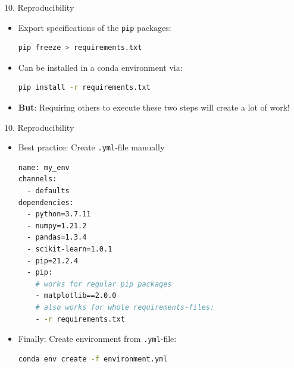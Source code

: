 
\begin{vbframe}{10. Reproducibility}

\vfill

\begin{itemize}
	\item Export specifications of the \texttt{pip} packages:
		\begin{lstlisting}[language=bash]
pip freeze > requirements.txt
		\end{lstlisting}
	\item Can be installed in a conda environment via:
		\begin{lstlisting}[language=bash]
pip install -r requirements.txt
		\end{lstlisting}
	\item \textbf{But}: Requiring others to execute these two steps will create a lot of work!
\end{itemize}

\vfill

\end{vbframe}


\begin{vbframe}{10. Reproducibility}

\vfill

\begin{itemize}
	\item Best practice: Create \texttt{.yml}-file manually
		\begin{lstlisting}[language=bash]
name: my_env
channels:
  - defaults
dependencies:
  - python=3.7.11
  - numpy=1.21.2
  - pandas=1.3.4
  - scikit-learn=1.0.1
  - pip=21.2.4
  - pip:
    # works for regular pip packages
    - matplotlib==2.0.0
    # also works for whole requirements-files:
    - -r requirements.txt
		\end{lstlisting}
	\item Finally: Create environment from \texttt{.yml}-file: 
		\begin{lstlisting}[language=bash]
conda env create -f environment.yml
		\end{lstlisting}
\end{itemize}

\vfill

\end{vbframe}

\endlecture

